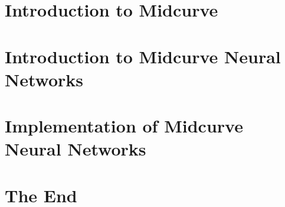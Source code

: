 \section[Intro]{Introduction to Midcurve}


\section[NN]{Introduction to Midcurve Neural Networks}


\section[NNIMPL]{Implementation of Midcurve Neural Networks}


\section[End]{The End}

